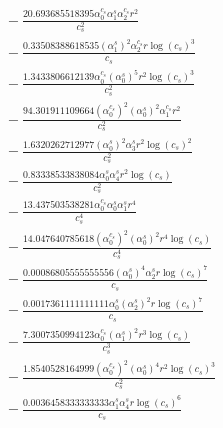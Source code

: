 \documentclass[10pt]{article}
\begin{document}
\begin{align*}
&{}  - \frac{20.693685518395 \alpha_{0}^{c_s} \alpha_{1}^s \alpha_{2}^{c_s} r^{2}}{c_{s}^{2}} \\
&{}  - \frac{0.33508388618535 \left(\alpha_{1}^s\right)^{2} \alpha_{2}^{c_s} r \log{\left(c_{s} \right)}^{3}}{c_{s}} \\
&{}  - \frac{1.3433806612139 \alpha_{0}^{c_s} \left(\alpha_{0}^s\right)^{5} r^{2} \log{\left(c_{s} \right)}^{3}}{c_{s}^{2}} \\
&{}  - \frac{94.301911109664 \left(\alpha_{0}^{c_s}\right)^{2} \left(\alpha_{0}^s\right)^{2} \alpha_{1}^{c_s} r^{2}}{c_{s}^{2}} \\
&{}  - \frac{1.6320262712977 \left(\alpha_{0}^s\right)^{2} \alpha_{3}^s r^{2} \log{\left(c_{s} \right)}^{2}}{c_{s}^{2}} \\
&{}  - \frac{0.83338533838084 \alpha_{0}^s \alpha_{4}^s r^{2} \log{\left(c_{s} \right)}}{c_{s}^{2}} \\
&{}  - \frac{13.437503538281 \alpha_{0}^{c_s} \alpha_{0}^s \alpha_{1}^s r^{4}}{c_{s}^{4}} \\
&{}  - \frac{14.047640785618 \left(\alpha_{0}^{c_s}\right)^{2} \left(\alpha_{0}^s\right)^{2} r^{4} \log{\left(c_{s} \right)}}{c_{s}^{4}} \\
&{}  - \frac{0.00086805555555556 \left(\alpha_{0}^s\right)^{4} \alpha_{2}^s r \log{\left(c_{s} \right)}^{7}}{c_{s}} \\
&{}  - \frac{0.0017361111111111 \alpha_{0}^s \left(\alpha_{2}^s\right)^{2} r \log{\left(c_{s} \right)}^{7}}{c_{s}} \\
&{}  - \frac{7.3007350994123 \alpha_{0}^{c_s} \left(\alpha_{1}^s\right)^{2} r^{3} \log{\left(c_{s} \right)}}{c_{s}^{3}} \\
&{}  - \frac{1.8540528164999 \left(\alpha_{0}^{c_s}\right)^{2} \left(\alpha_{0}^s\right)^{4} r^{2} \log{\left(c_{s} \right)}^{3}}{c_{s}^{2}} \\
&{}  - \frac{0.0036458333333333 \alpha_{1}^s \alpha_{4}^s r \log{\left(c_{s} \right)}^{6}}{c_{s}}
\end{align*}
\end{document}
